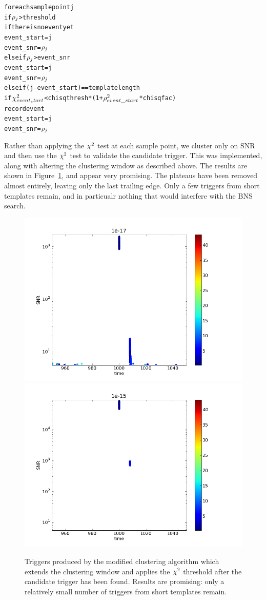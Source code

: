 \begin{alltt}
for each sample point j
  if \(\rho\sb{j}\) > threshold
    if there is no event yet
      event\_start = j
      event\_snr   = \(\rho\sb{j}\)
    else if \(\rho\sb{j}\) > event\_snr
      event\_start = j
      event\_snr = \(\rho\sb{j}\)
    else if (j - event\_start) == template length
      if \(\chisq\sb{event_start}\) < chisq thresh * ( 1 + \(\rho\sp{2}\sb{event\_start}\) * chisqfac )
        record event
      event\_start = j
      event\_snr   = \(\rho\sb{j}\)
\end{alltt}
%
Rather than applying the $\chi^2$ test at each sample point, we
cluster only on SNR and then use the $\chi^2$ test to validate the 
candidate trigger.  This was implemented, along with altering the
clustering window as described above.  The results are shown in
Figure~\ref{f:impulses_new_chisq}, and appear very promising.  The
plateaus have been removed almost entirely, leaving only the last
trailing edge.  Only a few triggers from short templates remain, and
in particualr nothing that would interfere with the BNS search.

\begin{figure}
  \includegraphics[width=0.5\linewidth]{figures/detchar/1e-17_fixed_20100909}
  \includegraphics[width=0.5\linewidth]{figures/detchar/1e-15_fixed_20100909}
  \caption[Triggers produced by modified clustering algorithm] {
  \label{f:impulses_new_chisq}
Triggers produced by the modified clustering algorithm which extends
the clustering window and applies the $\chi^2$  threshold after the
candidate trigger has been found.  Results are promising: only a
relatively small number of triggers from short templates remain.
}
\end{figure}%

